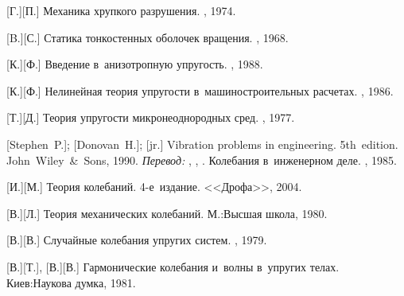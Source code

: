 \begin{thebibliography}{123}
\begin{otherlanguage}{russian}
[Г.][П.] Механика хрупкого разрушения. \naukapublisher, 1974. 

[B.][С.] Статика тонкостенных оболочек вращения. \naukapublisher, 1968. 

[К.][Ф.]
Введение в~анизотропную упругость.
\naukapublisher,
1988.

[К.][Ф.]
Нелинейная теория упругости в~машиностроительных расчетах.
\maschinenbauleningraderverlag,
1986.

[Т.][Д.] Теория упругости микронеоднородных сред. \naukapublisher, 1977. 

%
%



[Stephen~P.];
[Donovan~H.];
[jr.]
Vibration problems in engineering.
5th~edition.
John~Wiley~\&~Sons, 1990.
\emph{Перевод:} ,
,
.
Колебания в~инженерном деле.
\maschinenbaumoskauerverlag, 1985.

[И.][М.] Теория колебаний. 4\hbox{-}е~издание. <<Дрофа>>, 2004. 

[В.][Л.] Теория механических колебаний. М.:\;Высшая школа, 1980. 

[В.][В.] Случайные колебания упругих систем. \naukapublisher, 1979. 

[В.][Т.], [В.][В.] Гармонические колебания и~волны в~упругих телах. Киев:\;Наукова думка, 1981. 


\end{otherlanguage}
\end{thebibliography}
